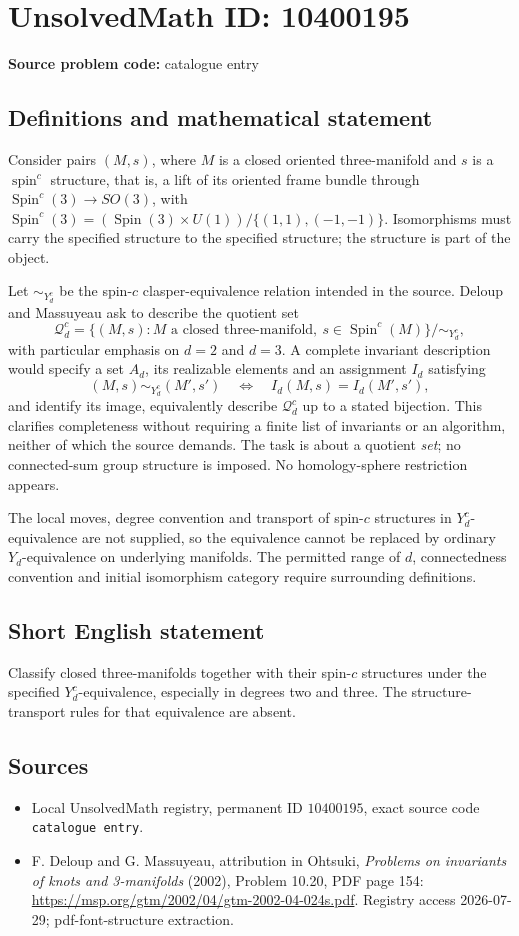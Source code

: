 \documentclass[11pt]{article}
\begin{document}
\section*{UnsolvedMath ID: 10400195}
\textbf{Source problem code:} catalogue entry
\subsection{Definitions and mathematical statement}
Consider pairs \((M,s)\), where \(M\) is a closed oriented three-manifold and \(s\) is a \(\operatorname{spin}^c\) structure, that is, a lift of its oriented frame bundle through \(\operatorname{Spin}^c(3)\to SO(3)\), with \(\operatorname{Spin}^c(3)=(\operatorname{Spin}(3)\times U(1))/\{(1,1),(-1,-1)\}\). Isomorphisms must carry the specified structure to the specified structure; the structure is part of the object.

Let \(\sim_{Y_d^c}\) be the spin-\(c\) clasper-equivalence relation intended in the source. Deloup and Massuyeau ask to describe the quotient set
\[\mathcal Q_d^c=\{(M,s):M\text{ a closed three-manifold},\ s\in\operatorname{Spin}^c(M)\}/\!\sim_{Y_d^c},\]
with particular emphasis on \(d=2\) and \(d=3\). A complete invariant description would specify a set \(A_d\), its realizable elements and an assignment \(I_d\) satisfying
\[(M,s)\sim_{Y_d^c}(M',s')\quad\Longleftrightarrow\quad I_d(M,s)=I_d(M',s'),\]
and identify its image, equivalently describe \(\mathcal Q_d^c\) up to a stated bijection. This clarifies completeness without requiring a finite list of invariants or an algorithm, neither of which the source demands. The task is about a quotient \emph{set}; no connected-sum group structure is imposed. No homology-sphere restriction appears.

The local moves, degree convention and transport of spin-\(c\) structures in \(Y_d^c\)-equivalence are not supplied, so the equivalence cannot be replaced by ordinary \(Y_d\)-equivalence on underlying manifolds. The permitted range of \(d\), connectedness convention and initial isomorphism category require surrounding definitions.
\subsection{Short English statement}
Classify closed three-manifolds together with their spin-\(c\) structures under the specified \(Y_d^c\)-equivalence, especially in degrees two and three. The structure-transport rules for that equivalence are absent.
\subsection{Sources}
\begin{itemize}
\item Local UnsolvedMath registry, permanent ID \(10400195\), exact source code \texttt{catalogue entry}.
\item F. Deloup and G. Massuyeau, attribution in Ohtsuki, \emph{Problems on invariants of knots and 3-manifolds} (2002), Problem 10.20, PDF page 154: \url{https://msp.org/gtm/2002/04/gtm-2002-04-024s.pdf}. Registry access 2026-07-29; pdf-font-structure extraction.
\end{itemize}
\end{document}
